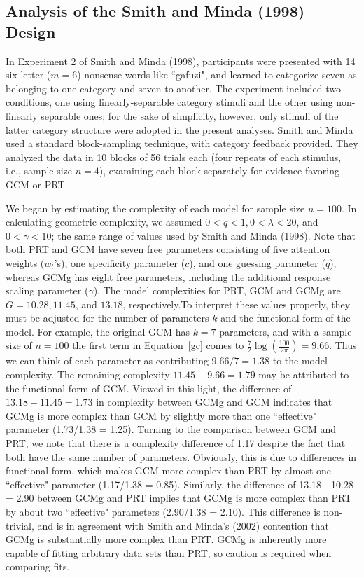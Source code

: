 \documentclass[11pt]{article}
\begin{document}
\subsection*{Analysis of the Smith and Minda (1998) Design}
In Experiment 2 of Smith and Minda (1998), participants were presented with 14 six-letter ($m=6$)
nonsense words like ``gafuzi", and learned to categorize seven as belonging to one category and
seven to another. The experiment included two conditions, one using linearly-separable category
stimuli and the other using non-linearly separable ones; for the sake of simplicity, however, only
stimuli of the latter category structure were adopted in the present analyses. Smith and Minda
used a standard block-sampling technique, with category feedback provided. They analyzed the data
in 10 blocks of 56 trials each (four repeats of each stimulus, i.e., sample size $n = 4$),
examining each block separately for evidence favoring GCM or PRT.


We began by estimating the complexity of each model for sample size $n = 100$. In calculating
geometric complexity, we assumed $0< q < 1, 0 < \lambda < 20$, and $0 < \gamma < 10$; the same
range of values used by Smith and Minda (1998). Note that both PRT and GCM have seven free
parameters consisting of five attention weights ($w_t$'s), one specificity parameter ($c$), and
one guessing parameter ($q$), whereas GCMg has eight free parameters, including the additional
response scaling parameter ($\gamma$). The model complexities for PRT, GCM and GCMg are $G =
10.28, 11.45$, and $13.18$, respectively.\footnotemark[6] To interpret these values properly, they
must be adjusted for the number of parameters $k$ and the functional form of the model. For
example, the original GCM has $k=7$ parameters, and with a sample size of $n=100$ the first term
in Equation~\ref{gc} comes to $\frac{7}{2}\log (\frac{100}{2 \pi}) = 9.66$. Thus we can think of
each parameter as contributing $9.66/7 = 1.38$ to the model complexity. The remaining complexity
$11.45-9.66=1.79$ may be attributed to the functional form of GCM. Viewed in this light, the
difference of $13.18 - 11.45 = 1.73$ in complexity between GCMg and GCM indicates that GCMg is
more complex than GCM by slightly more than one ``effective" parameter (1.73/1.38 = 1.25). Turning
to the comparison between GCM and PRT, we note that there is a complexity difference of 1.17
despite the fact that both have the same number of parameters. Obviously, this is due to
differences in functional form, which makes GCM more complex than PRT by almost one ``effective"
parameter (1.17/1.38 = 0.85). Similarly, the difference of 13.18 - 10.28 = 2.90 between GCMg and
PRT implies that GCMg is more complex than PRT by about two ``effective" parameters (2.90/1.38 =
2.10). This difference is non-trivial, and is in agreement with Smith and Minda's (2002)
contention that GCMg is substantially more complex than PRT. GCMg is inherently more capable of
fitting arbitrary data sets than PRT, so caution is required when comparing fits.
\end{document}
